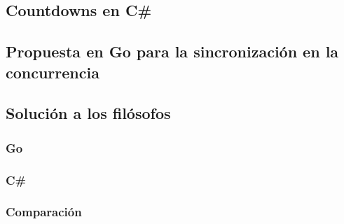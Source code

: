 \documentclass[10pt]{article} %
\begin{document}
\subsection{Countdowns en C\#}

\subsection{Propuesta en Go para la sincronización en la concurrencia}

\subsection{Solución a los filósofos}

\subsubsection{Go}

\subsubsection{C\#}

\subsubsection{Comparaci\'on}
\end{document}

